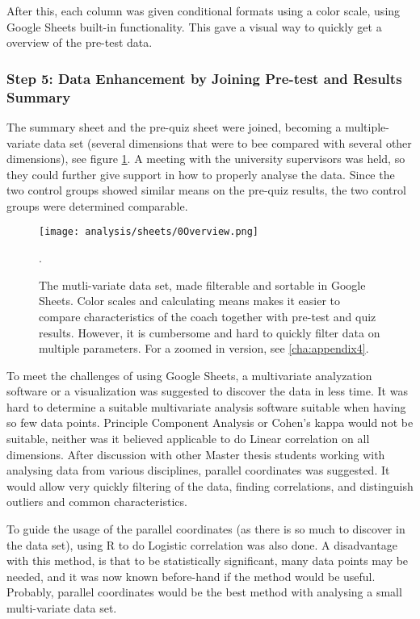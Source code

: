 After this, each column was given conditional formats using a color scale, using Google Sheets built-in functionality. This gave a visual way to quickly get a overview of the pre-test data.

\subsubsection{Step 5: Data Enhancement by Joining Pre-test and Results Summary}

The summary sheet and the pre-quiz sheet were joined, becoming a multiple-variate data set (several dimensions that were to bee compared with several other dimensions), see figure \ref{fig:analysFarg3}. A meeting with the university supervisors was held, so they could further give support in how to properly analyse the data. Since the two control groups showed similar means on the pre-quiz results, the two control groups were determined comparable.

\begin{figure}[h]
    \centering
    \texttt{[image: analysis/sheets/0Overview.png]}
    \caption{The mutli-variate data set, made filterable and sortable in Google Sheets. Color scales and calculating means makes it easier to compare characteristics of the coach together with pre-test and quiz results. However, it is cumbersome and hard to quickly filter data on multiple parameters. For a zoomed in version, see \ref{cha:appendix4}.}.
    \label{fig:analysFarg3}
\end{figure}

To meet the challenges of using Google Sheets, a multivariate analyzation software or a visualization was suggested to discover the data in less time. It was hard to determine a suitable multivariate analysis software suitable when having so few data points. Principle Component Analysis or Cohen's kappa would not be suitable, neither was it believed applicable to do Linear correlation on all dimensions. After discussion with other Master thesis students working with analysing data from various disciplines, parallel coordinates was suggested. It would allow very quickly filtering of the data, finding correlations, and distinguish outliers and common characteristics.

To guide the usage of the parallel coordinates (as there is so much to discover in the data set), using R to do Logistic correlation was also done. A disadvantage with this method, is that to be statistically significant, many data points may be needed, and it was now known before-hand if the method would be useful. Probably, parallel coordinates would be the best method with analysing a small multi-variate data set.


